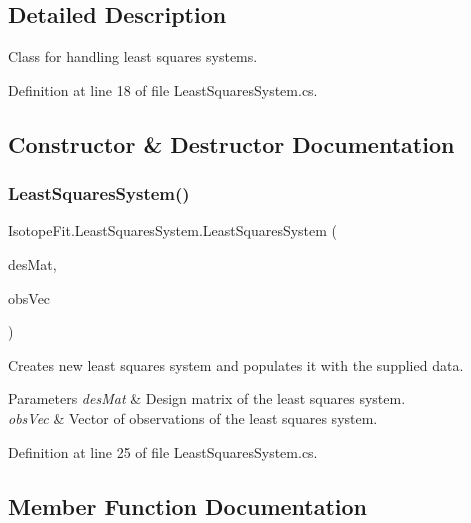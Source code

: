 \subsection{Detailed Description}
Class for handling least squares systems. 



Definition at line 18 of file Least\+Squares\+System.\+cs.



\subsection{Constructor \& Destructor Documentation}
\mbox{\label{class_isotope_fit_1_1_least_squares_system_aec0b3973e7239d006b752a4e079f80d0}} 
\subsubsection{\texorpdfstring{Least\+Squares\+System()}{LeastSquaresSystem()}}
{\footnotesize\ttfamily Isotope\+Fit.\+Least\+Squares\+System.\+Least\+Squares\+System (\begin{DoxyParamCaption}\item[{Sparse\+Matrix}]{des\+Mat,  }\item[{Vector$<$ double $>$}]{obs\+Vec }\end{DoxyParamCaption})}



Creates new least squares system and populates it with the supplied data. 


\begin{DoxyParams}{Parameters}
{\em des\+Mat} & Design matrix of the least squares system.\\
\hline
{\em obs\+Vec} & Vector of observations of the least squares system.\\
\hline
\end{DoxyParams}


Definition at line 25 of file Least\+Squares\+System.\+cs.



\subsection{Member Function Documentation}
\mbox{\label{class_isotope_fit_1_1_least_squares_system_ac72b8568e9ecb97077102658f56aba3f}} 
